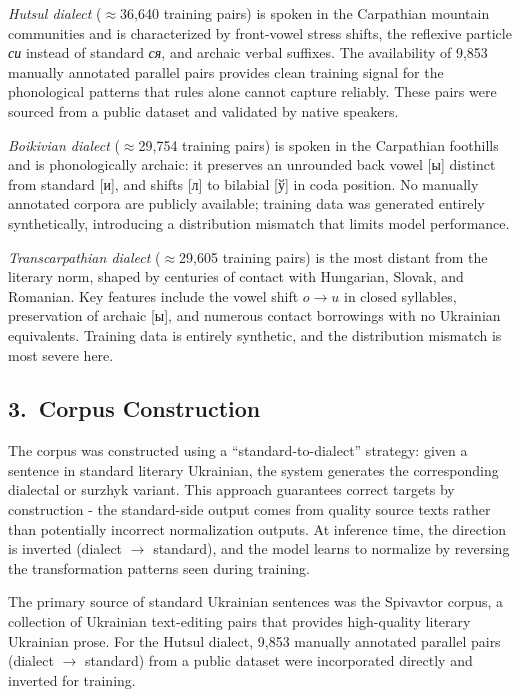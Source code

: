 \documentclass[14pt]{extarticle}
\begin{document}
\textit{Hutsul dialect} (${\approx}$36,640 training pairs) is spoken in the Carpathian mountain
communities and is characterized by front-vowel stress shifts, the reflexive particle \textit{си}
instead of standard \textit{ся}, and archaic verbal suffixes. The availability of 9,853 manually
annotated parallel pairs provides clean training signal for the phonological patterns that rules
alone cannot capture reliably. These pairs were sourced from a public dataset and validated by
native speakers.

\textit{Boikivian dialect} (${\approx}$29,754 training pairs) is spoken in the Carpathian foothills
and is phonologically archaic: it preserves an unrounded back vowel [ы] distinct from standard [и],
and shifts [л] to bilabial [ў] in coda position. No manually annotated corpora are publicly
available; training data was generated entirely synthetically, introducing a distribution mismatch
that limits model performance.

\textit{Transcarpathian dialect} (${\approx}$29,605 training pairs) is the most distant from the
literary norm, shaped by centuries of contact with Hungarian, Slovak, and Romanian. Key features
include the vowel shift $o \rightarrow u$ in closed syllables, preservation of archaic [ы], and
numerous contact borrowings with no Ukrainian equivalents. Training data is entirely synthetic,
and the distribution mismatch is most severe here.

\subsection*{3.~Corpus Construction}

The corpus was constructed using a ``standard-to-dialect'' strategy: given a sentence in standard
literary Ukrainian, the system generates the corresponding dialectal or surzhyk variant. This
approach guarantees correct targets by construction - the standard-side output comes from quality
source texts rather than potentially incorrect normalization outputs. At inference time, the
direction is inverted (dialect $\rightarrow$ standard), and the model learns to normalize by
reversing the transformation patterns seen during training.

The primary source of standard Ukrainian sentences was the Spivavtor corpus, a collection of
Ukrainian text-editing pairs that provides high-quality literary Ukrainian prose. For the Hutsul
dialect, 9,853 manually annotated parallel pairs (dialect $\rightarrow$ standard) from a public
dataset were incorporated directly and inverted for training.
\end{document}
